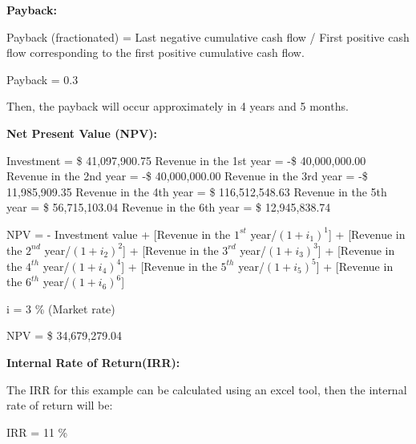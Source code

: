 \textbf{Payback:}

Payback (fractionated) = Last negative cumulative cash flow / First positive cash flow corresponding to the first positive cumulative cash flow.

Payback = 0.3

Then, the payback will occur approximately in 4 years and 5 months.

\textbf{Net Present Value (NPV):}

Investment = \$ 41,097,900.75
Revenue in the 1st year = -\$ 40,000,000.00
Revenue in the 2nd year = -\$ 40,000,000.00
Revenue in the 3rd year = -\$ 11,985,909.35
Revenue in the 4th year = \$ 116,512,548.63
Revenue in the 5th year = \$ 56,715,103.04
Revenue in the 6th year = \$ 12,945,838.74

NPV = - Investment value + [Revenue in the $1^{st}$ year/$(1 + i_{1})^{1}$] + [Revenue in the $2^{nd}$ year/$(1 + i_{2})^{2}$] + [Revenue in the $3^{rd}$ year/$(1 + i_{3})^{3}$] + [Revenue in the $4^{th}$ year/$(1 + i_{4})^{4}$] + [Revenue in the $5^{th}$ year/$(1 + i_{5})^{5}$] + [Revenue in the $6^{th}$ year/$(1 + i_{6})^{6}$]

i = 3 \% (Market rate)

NPV = \$ 34,679,279.04

\textbf{Internal Rate of Return(IRR):}

The IRR for this example can be calculated using an excel tool, then the internal rate of return will be:

IRR = 11 \%



